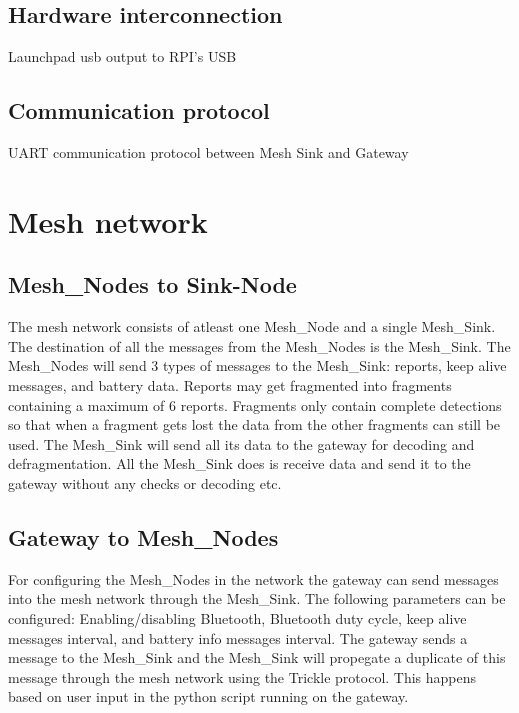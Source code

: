 \documentclass[12pt]{article}
\begin{document}
\subsection{Hardware interconnection}


Launchpad usb output to RPI's USB


\subsection{Communication protocol}


UART communication protocol between Mesh Sink and Gateway

\section{Mesh network}
\subsection{Mesh\_Nodes to Sink-Node}
The mesh network consists of atleast one Mesh\_Node and a single Mesh\_Sink.
The destination of all the messages from the Mesh\_Nodes is  the Mesh\_Sink.
The Mesh\_Nodes will send 3 types of messages to the Mesh\_Sink: reports, keep alive messages, and battery data.
Reports may get fragmented into fragments containing a maximum of 6 reports. 
Fragments only contain complete detections so that when a fragment gets lost the data from the other fragments can still be used.
The Mesh\_Sink will send all its data to the gateway for decoding and defragmentation. 
All the Mesh\_Sink does is receive data and send it to the gateway without any checks or decoding etc.

\subsection{Gateway to Mesh\_Nodes}
For configuring the Mesh\_Nodes in the network the gateway can send messages into the mesh network through the Mesh\_Sink.
The following parameters can be configured:  Enabling/disabling Bluetooth, Bluetooth duty cycle, keep alive messages interval, and battery info messages interval.
The gateway sends a message to the Mesh\_Sink and the Mesh\_Sink will propegate a duplicate of this message through the mesh network using  the Trickle protocol.
This happens based on user input in the python script running on the gateway.





%
%
\end{document}
